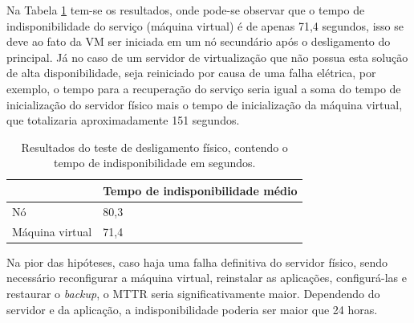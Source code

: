 Na Tabela \ref{tab:teste1resultados} tem-se os resultados, onde pode-se observar que o tempo de indisponibilidade do serviço (máquina virtual) 
é de apenas 71,4 segundos, isso se deve ao fato da \ac{VM} ser iniciada em um nó secundário após o desligamento do principal. 
Já no caso de um servidor de virtualização que não possua esta solução de alta disponibilidade, seja reiniciado por causa de uma falha elétrica, 
por exemplo, o tempo para a recuperação do serviço seria igual a soma do tempo de inicialização do servidor físico mais o tempo de inicialização 
da máquina virtual, que totalizaria aproximadamente 151 segundos. 



\begin{table}[h!]
\caption{Resultados do teste de desligamento físico, contendo o tempo de indisponibilidade em segundos.}
\small
\label{tab:teste1resultados}
\begin{center}
\begin{tabular}{|l|l|}\hline
 & \textbf{Tempo de indisponibilidade médio} \\\hline %
Nó & 80,3 \\\hline %
Máquina virtual & 71,4 \\\hline %
\end{tabular}
\end{center}
\end{table}

Na pior das hipóteses, caso haja uma falha definitiva do servidor físico, sendo necessário reconfigurar a máquina virtual, reinstalar as aplicações,
configurá-las e restaurar o \textit{backup}, o \ac{MTTR} seria significativamente maior. Dependendo do servidor e da aplicação, 
a indisponibilidade poderia ser maior que 24 horas.


